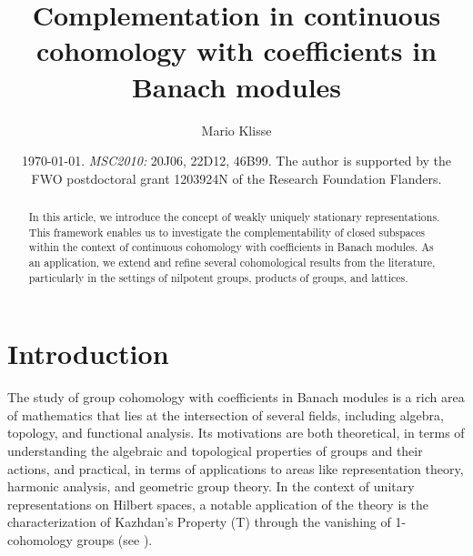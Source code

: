 \documentclass[a4paper,11pt,reqno]{amsart}
\numberwithin{equation}{section}
\theoremstyle{definition}
\theoremstyle{remark}
\theoremstyle{remark}
\begin{document}
\title{Complementation in continuous cohomology with coefficients in Banach modules}


\author{Mario Klisse}

\address{KU Leuven, Department of Mathematics,
Celestijnenlaan 200B, 3001 Leuven, Belgium}


\begin{abstract}

In this article, we introduce the concept of weakly uniquely stationary representations. This framework enables us to investigate the complementability of closed subspaces within the context of continuous cohomology with coefficients in Banach modules. As an application, we extend and refine several cohomological results from the literature, particularly in the settings of nilpotent groups, products of groups, and lattices.


\end{abstract}


\date{\today. \emph{MSC2010:}  20J06, 22D12, 46B99. The author is supported by the FWO postdoctoral grant 1203924N of the Research Foundation Flanders.}

\maketitle

\section*{Introduction}

The study of group cohomology with coefficients in Banach modules is a rich area of mathematics that lies at the intersection of several fields, including algebra, topology, and functional analysis. Its motivations are both theoretical, in terms of understanding the algebraic and topological properties of groups and their actions, and practical, in terms of applications to areas like representation theory, harmonic analysis, and geometric group theory. In the context of unitary representations on Hilbert spaces, a notable application of the theory is the characterization of Kazhdan's Property (T) through the vanishing of 1-cohomology groups (see \cite{Delorme77}).
\end{document}
